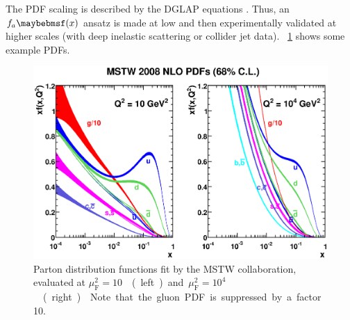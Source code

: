 The PDF \muf scaling is described by the DGLAP equations 
\cite{Gribov:1972,Altarelli:1977,Dokshitser:1977}. Thus, an $f_a \parenths{x}$ ansatz is 
made at low \muf and then experimentally validated at higher scales (\eg with deep 
inelastic scattering or collider jet data). \Figure~\ref{fig:qcd:pdf} shows some example 
PDFs.

\begin{figure}
	\includegraphics[width=\largefigwidth]{tex/tools/pdf}
	\caption{Parton distribution functions fit by the MSTW collaboration, evaluated at 
	\unit{$\mu_{\text{F}}^2 = 10$}{\GeV\squared} (left) and 
	\unit{$\mu_{\text{F}}^2 = 10^4$}{\GeV\squared} (right) \cite{MSTW}. Note that the 
	gluon PDF is suppressed by a factor 10.}
	\label{fig:qcd:pdf}
\end{figure}
